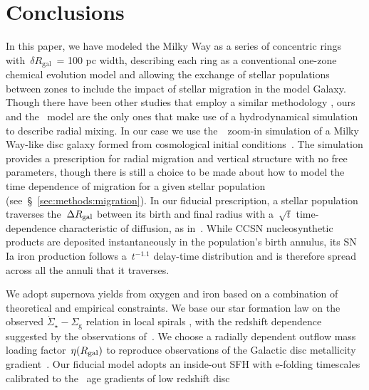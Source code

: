\documentclass[draft2.tex]{subfiles}
\begin{document}
 

\section{Conclusions} 
\label{sec:conclusions} 

In this paper, we have modeled the Milky Way as a series of concentric rings 
with~$\delta R_\text{gal}$~= 100 pc width, describing each ring as a 
conventional one-zone chemical evolution model and allowing the exchange of 
stellar populations between zones to include the impact of stellar migration in 
the model Galaxy. 
Though there have been other studies that employ a similar methodology 
\citep[e.g.][]{Schoenrich2009a, Schoenrich2009b, Kubryk2015a, Kubryk2015b, 
Sharma2020}, ours and the~\citet{Minchev2013, Minchev2014, Minchev2017} model 
are the only ones that make use of a hydrodynamical simulation to describe 
radial mixing. 
In our case we use the~\hsim~zoom-in simulation of a Milky Way-like disc galaxy 
formed from cosmological initial conditions~\citep{Christensen2012, 
Zolotov2012, Loebman2012, Brooks2014, Bird2021}. 
The simulation provides a prescription for radial migration and vertical 
structure with no free parameters, though there is still a choice to be made 
about how to model the time dependence of migration for a given stellar 
population (see~\S~\ref{sec:methods:migration}). 
In our fiducial prescription, a stellar population traverses the~$\Delta R_\text{gal}$ 
between its birth and final radius with a~$\sqrt{t}$ time-dependence 
characteristic of diffusion, as in~\citet{Frankel2018, Frankel2020}. 
While CCSN nucleosynthetic products are deposited instantaneously in the 
population's birth annulus, its SN Ia iron production follows a~$t^{-1.1}$ 
delay-time distribution and is therefore spread across all the annuli that it 
traverses. 
\par 
We adopt supernova yields from oxygen and iron based on a combination of 
theoretical and empirical constraints. 
We base our star formation law on the observed 
$\dot{\Sigma}_\star - \Sigma_\text{g}$ relation in local spirals 
\citep{Bigiel2010, Leroy2013, Krumholz2018a}, with the redshift dependence 
suggested by the observations of~\citet{Tacconi2018}. 
We choose a radially dependent outflow mass loading factor~$\eta(R_\text{gal})$ to 
reproduce observations of the Galactic disc metallicity 
gradient~\citep[e.g.][]{Frinchaboy2013, Hayden2014, Weinberg2019}. 
Our fiducial model adopts an inside-out SFH with e-folding timescales 
calibrated to the~\citet{Sanchez2020} age gradients of low redshift disc 
\end{document}
